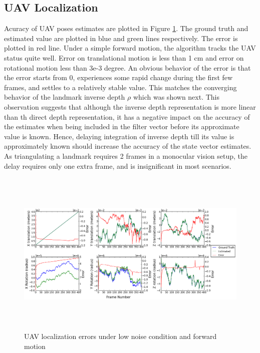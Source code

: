 \subsection{UAV Localization}
Acuracy of UAV poses estimates are plotted in Figure
\ref{fig:simfig1}. The ground truth and estimated value are plotted
in blue and green lines respectively. The error is plotted in red
line. Under a simple forward motion, the algorithm tracks the
UAV status quite well. Error on translational motion is less than 1
cm and error on rotational motion less than 3e-3 degree. An obvious
behavior of the error is that the error starts from 0, experiences
some rapid change during the first few frames, and settles to a
relatively stable value. This matches the converging behavior of the
landmark inverse depth $\rho$ which was shown next. This observation
suggests that although the inverse depth representation is more linear
than th direct depth representation, it has a negative impact on the
accuracy of the estimates when being included in the filter vector
before its approximate value is known. Hence, delaying integration of
inverse depth till its value is approximately known should increase
the accuracy of the state vector estimates. As triangulating a
landmark requires 2 frames in a monocular vision setup, the delay
requires only one extra frame, and is insignificant in most scenarios.

\begin{figure}[h]
\centering
\includegraphics[width=16cm, height=8cm]{./Figures/SimulationFigures/Figure1.png}
\caption{UAV localization errors under low noise condition and forward motion}
\label{fig:simfig1}
\end{figure}
\FloatBarrier

